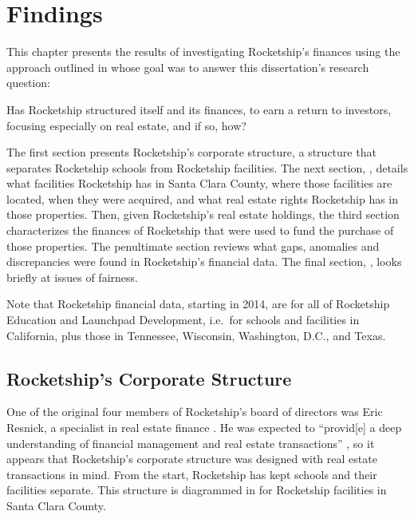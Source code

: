 
\chapter{Findings}\label{ch:findings}%
This chapter presents the results of investigating Rocketship's finances using the approach outlined in  whose goal was to answer this dissertation's research question:
\begin{textquote}
{Has Rocketship structured itself and its finances, to earn a return to investors, focusing especially on real estate, and if so, how?}
\end{textquote}

The first section presents Rocketship's corporate structure, a structure that separates Rocketship schools from Rocketship facilities. The next section, , details what facilities Rocketship has in Santa Clara County, where those facilities are located, when they were acquired, and what real estate rights Rocketship has in those properties. Then, given Rocketship's real estate holdings, the third section characterizes the finances of Rocketship that were used to fund the purchase of those properties. The penultimate section reviews what gaps, anomalies and discrepancies were found in Rocketship's financial data. The final section, , looks briefly at issues of fairness.

Note that Rocketship financial data, starting in 2014, are for all of Rocketship Education and Launchpad Development, i.e.\ for schools and facilities in California, plus those in Tennessee, Wisconsin, Washington, D.C., and Texas.

\section{Rocketship's Corporate Structure}%
 \label{sec:RSED-corporate-structure}\indent%

   One of the original four members of Rocketship's board of directors was Eric Resnick, a specialist in real estate finance \parencite{MarketScreener2024}. He was expected to ``provid[e] a deep understanding of financial management and real estate transactions'' \parencite[13]{Danner2006}, so it appears that Rocketship's corporate structure was designed with real estate transactions in mind. From the start, Rocketship has kept schools and their facilities separate. This structure is diagrammed in  for Rocketship facilities in Santa Clara County.

